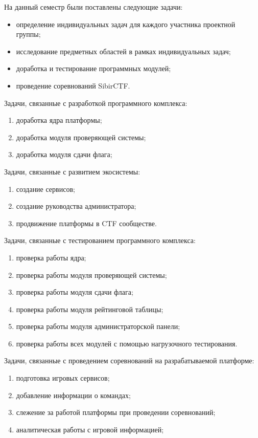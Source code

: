 На данный семестр были поставлены следующие задачи:

\begin{itemize}
\item определение индивидуальных задач для каждого участника проектной группы;
\item исследование предметных областей в рамках индивидуальных задач;
\item доработка и тестирование программных модулей;
\item проведение соревнований SibirCTF.
\end{itemize}

Задачи, связанные с разработкой программного комплекса:

\begin{enumerate}
\item доработка ядра платформы;
\item доработка модуля проверяющей системы;
\item доработка модуля сдачи флага;
\end{enumerate}

Задачи, связанные с развитием экосистемы:

\begin{enumerate}
\item создание сервисов;
\item создание руководства администратора;
\item продвижение платформы в CTF сообществе.
\end{enumerate}

Задачи, связанные с тестированием программного комплекса:

\begin{enumerate}
\item проверка работы ядра;
\item проверка работы модуля проверяющей системы;
\item проверка работы модуля сдачи флага;
\item проверка работы модуля рейтинговой таблицы;
\item проверка работы модуля администраторской панели;
\item проверка работы всех модулей с помощью нагрузочного тестирования.
\end{enumerate}

Задачи, связанные с проведением соревнований на разрабатываемой платформе:

\begin{enumerate}
\item подготовка игровых сервисов;
\item добавление информации о командах;
\item слежение за работой платформы при проведении соревнований;
\item аналитическая работы с игровой информацией;
\end{enumerate}